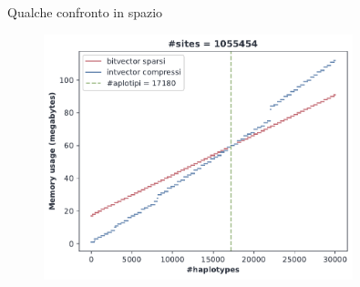 \documentclass[]{beamer}
\begin{document}
\begin{frame}{Qualche confronto in spazio}
  \begin{figure}[H]
    \centering
    \hspace{-0.2cm}\includegraphics[width=0.8\textwidth]{img/bv_vs_iv2.pdf}
  \end{figure}
\end{frame}
\end{document}
